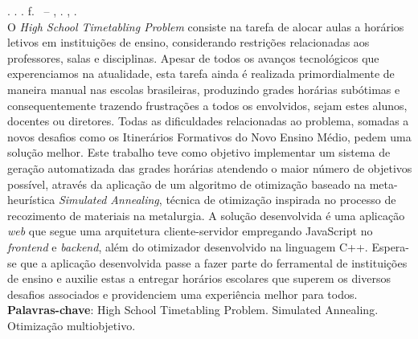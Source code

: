
\begin{resumo}[RESUMO]
\begin{SingleSpacing}

\imprimirautorcitacao. \imprimirtitulo. \imprimirdata. \pageref {LastPage} f. \imprimirprojeto\ – \imprimirprograma, \imprimirinstituicao. \imprimirlocal, \imprimirdata.\\

O \textit{High School Timetabling Problem} consiste na tarefa de alocar aulas a horários letivos em instituições de ensino, considerando restrições relacionadas aos professores, salas e disciplinas. Apesar de todos os avanços tecnológicos que experenciamos na atualidade, esta tarefa ainda é realizada primordialmente de maneira manual nas escolas brasileiras, produzindo grades horárias subótimas e consequentemente trazendo frustrações a todos os envolvidos, sejam estes alunos, docentes ou diretores. Todas as dificuldades relacionadas ao problema, somadas a novos desafios como os Itinerários Formativos do Novo Ensino Médio, pedem uma solução melhor. Este trabalho teve como objetivo implementar um sistema de geração automatizada das grades horárias atendendo o maior número de objetivos possível, através da aplicação de um algoritmo de otimização baseado na meta-heurística \textit{Simulated Annealing}, técnica de otimização inspirada no processo de recozimento de materiais na metalurgia. A solução desenvolvida é uma aplicação \textit{web} que segue uma arquitetura cliente-servidor empregando JavaScript no \textit{frontend} e \textit{backend}, além do otimizador desenvolvido na linguagem C++. Espera-se que a aplicação desenvolvida passe a fazer parte do ferramental de instituições de ensino e auxilie estas a entregar horários escolares que superem os diversos desafios associados e providenciem uma experiência melhor para todos.
\\

\textbf{Palavras-chave}: High School Timetabling Problem. Simulated Annealing. Otimização multiobjetivo.

\end{SingleSpacing}
\end{resumo}

